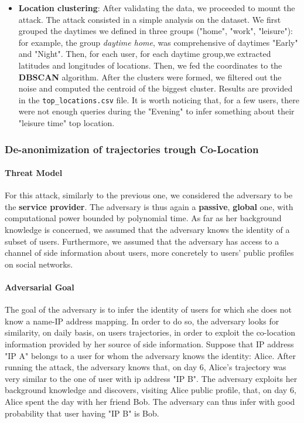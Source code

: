 \documentclass[10pt,conference,compsocconf]{IEEEtran}
\begin{document}
\begin{itemize}
    \item \textbf{Location clustering}: After validating the data, we proceeded
    to mount the attack. The attack consisted in a simple analysis on the
    dataset. We first grouped the daytimes we defined in three groups ("home", "work", "leisure"): for example, the group \textit{daytime home},
    was comprehensive of daytimes "Early" and "Night". Then, for
    each user, for each daytime group,we
    extracted latitudes and longitudes of locations. Then, we fed the
    coordinates to the \textbf{DBSCAN} algorithm. After
    the clusters were formed, we filtered out the noise and computed
    the centroid of the biggest cluster. Results are provided in the \texttt{top\_locations.csv} file. It is
    worth noticing that, for a few users, there were not enough queries during
    the "Evening" to infer something about their "leisure time" top location.
\end{itemize}

\subsubsection{De-anonimization of trajectories trough Co-Location}


\paragraph{Threat Model}
For this attack, similarly to the previous one, we considered the adversary to
be the \textbf{service provider}. The adversary is thus again a
\textbf{passive}, \textbf{global} one, with computational power bounded by
polynomial time.\newline
As far as her background knowledge is concerned, we assumed that the adversary
knows the identity of a subset of users. Furthermore, we assumed that
the adversary has access to a channel of side information about users, more
concretely to users' public profiles on social networks.


\paragraph{Adversarial Goal}
The goal of the adversary is to infer the identity of users for which she does
not know a name-IP address mapping. In order to do so, the adversary looks for
similarity, on daily basis, on users trajectories, in order to exploit the
co-location information provided by her source of side information. Suppose that IP address "IP A" belongs to a user for
whom the adversary knows the identity: Alice. After running the attack, the
adversary knows that, on day 6, Alice's trajectory was very similar to the one
of user with ip address "IP B". The adversary exploits her background knowledge
and discovers, visiting Alice public profile, that, on day 6, Alice spent the
day with her friend Bob. The adversary can thus infer with good probability that
user having "IP B" is Bob.
\end{document}
